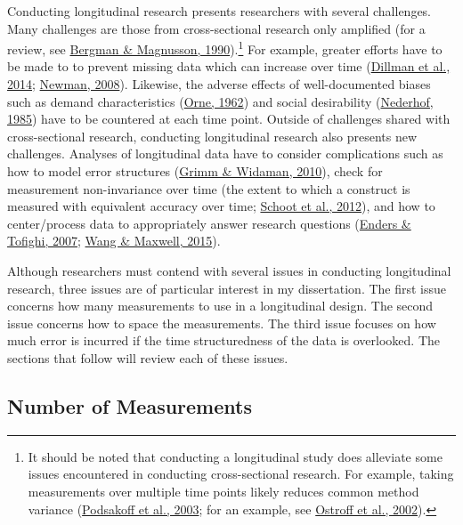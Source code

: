 \documentclass[
12pt, %
twoside,
english]{guelphthesis}
\begin{document}
Conducting longitudinal research presents researchers with several challenges. Many challenges are those from cross-sectional research only amplified (for a review, see \protect\hyperlink{ref-bergman1993}{Bergman \& Magnusson, 1990}).\footnote{It should be noted that conducting a longitudinal study does alleviate some issues encountered in conducting cross-sectional research. For example, taking measurements over multiple time points likely reduces common method variance (\protect\hyperlink{ref-podsakoff2003}{Podsakoff et al., 2003}; for an example, see \protect\hyperlink{ref-ostroff2002}{Ostroff et al., 2002}).} For example, greater efforts have to be made to to prevent missing data which can increase over time (\protect\hyperlink{ref-dillman2014}{Dillman et al., 2014}; \protect\hyperlink{ref-newman2008}{Newman, 2008}). Likewise, the adverse effects of well-documented biases such as demand characteristics (\protect\hyperlink{ref-orne1962}{Orne, 1962}) and social desirability (\protect\hyperlink{ref-nederhof1985}{Nederhof, 1985}) have to be countered at each time point. Outside of challenges shared with cross-sectional research, conducting longitudinal research also presents new challenges. Analyses of longitudinal data have to consider complications such as how to model error structures (\protect\hyperlink{ref-grimm2010a}{Grimm \& Widaman, 2010}), check for measurement non-invariance over time (the extent to which a construct is measured with equivalent accuracy over time; \protect\hyperlink{ref-vandeschoot2012}{Schoot et al., 2012}), and how to center/process data to appropriately answer research questions (\protect\hyperlink{ref-enders2007}{Enders \& Tofighi, 2007}; \protect\hyperlink{ref-wang2015}{Wang \& Maxwell, 2015}).

Although researchers must contend with several issues in conducting longitudinal research, three issues are of particular interest in my dissertation. The first issue concerns how many measurements to use in a longitudinal design. The second issue concerns how to space the measurements. The third issue focuses on how much error is incurred if the time structuredness of the data is overlooked. The sections that follow will review each of these issues.

\hypertarget{number-of-measurements}{%
\subsection{Number of Measurements}\label{number-of-measurements}}
\end{document}
